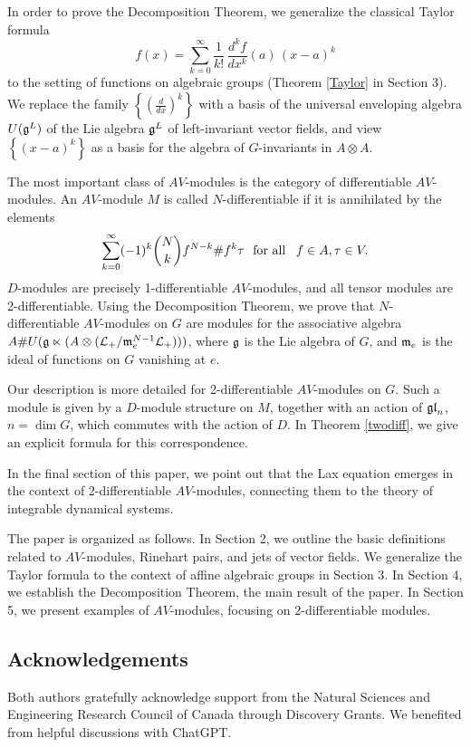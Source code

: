 \documentclass[12pt]{amsart}
\begin{document}
In order to prove the Decomposition Theorem, we generalize the classical Taylor formula 
$$f(x) = \sum_{k=0}^\infty \frac{1}{k!} \,\frac{d^k f}{d x^k} (a) \,(x-a)^k$$
to the setting of functions on algebraic groups (Theorem \ref{Taylor} in Section 3). We replace the family
$\left\{\left(\frac{d}{dx}\right)^k\right\}$ with a basis of the universal enveloping algebra $U(\mathfrak{g}^L)$ of the Lie algebra $\mathfrak{g}^L$ of left-invariant vector fields, and view $\left\{ (x-a)^k \right\}$ as a basis for the algebra of $G$-invariants in $A \otimes A$.  

The most important class of $AV$-modules is the category of differentiable $AV$-modules. An $AV$-module $M$ is called $N$-differentiable if it is annihilated by the elements 
$$\sum\limits_{k=0}^\infty (-1)^k {N \choose k} f^{N-k} \# f^k \tau \ \ \text{for all \, } f\in A, \tau\in V.$$
$D$-modules are precisely 1-differentiable $AV$-modules, and all tensor modules are 2-differentiable.
Using the Decomposition Theorem, we prove that $N$-differentiable $AV$-modules on $G$ are modules for the associative algebra $A \# U(\mathfrak{g} \ltimes (A \otimes ({\mathcal L}_+ / \mathfrak{m}_e^{N-1} {\mathcal L}_+)))$,
where $\mathfrak{g}$ is the Lie algebra of $G$, and $\mathfrak{m}_e$ is the ideal of functions on $G$ vanishing at $e$.

Our description is more detailed for 2-differentiable $AV$-modules on $G$. Such a module is given by a $D$-module structure on $M$, together with an action of $\mathfrak{gl}_n$, $n = \dim G$, which commutes with the action of $D$. In Theorem  \ref{twodiff}, we give an explicit formula for this correspondence.

In the final section of this paper, we point out that the Lax equation emerges in the context of 2-differentiable $AV$-modules, connecting them to the theory of integrable dynamical systems.

The paper is organized as follows. In Section 2, we outline the basic definitions related to $AV$-modules, Rinehart pairs, and jets of vector fields. We generalize the Taylor formula to the context of affine algebraic groups in Section 3. In Section 4, we establish the Decomposition Theorem, the main result of the paper. In Section 5, we present examples of $AV$-modules, focusing on 2-differentiable modules.

\subsection*{Acknowledgements} Both authors gratefully acknowledge support from the Natural Sciences and Engineering Research Council of Canada through Discovery Grants. We benefited from helpful discussions with ChatGPT.
\end{document}
